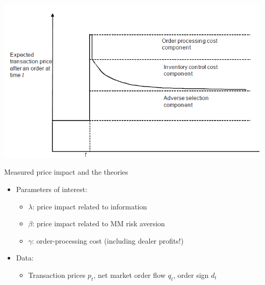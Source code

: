 \documentclass[english,10pt
,aspectratio=169
]{beamer}
\begin{document}



\begin{frame}{}
	\includegraphics[width=0.8\linewidth]{pics/PriceDiscovery_Image}
\end{frame}


\begin{frame}{Measured price impact and the theories}
	\begin{itemize}
		\item Parameters of interest:
		\begin{itemize}
			\item $\lambda$: price impact related to information
			\item $\beta$: price impact related to MM risk aversion
			\item $\gamma$: order-processing cost (including dealer profits!)
		\end{itemize}
		\item Data:
		\begin{itemize}
			\item Transaction prices $p_t$, net market order flow $q_t$, order sign $d_t$
		\end{itemize}
	\end{itemize}
\end{frame}
\end{document}
